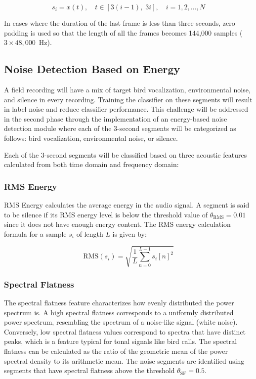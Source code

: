 \documentclass[conference]{IEEEtran}
\begin{document}
\begin{equation}
s_i = x(t), \quad t \in [3(i-1),\; 3i], \quad i = 1, 2, \ldots, N
\end{equation}

In cases where the duration of the last frame is less than three seconds, zero padding is used so that the length of all the frames becomes 144,000 samples ($3 \times 48{,}000$~Hz).

\subsection{Noise Detection Based on Energy}

A field recording will have a mix of target bird vocalization, environmental noise, and silence in every recording. Training the classifier on these segments will result in label noise and reduce classifier performance. This challenge will be addressed in the second phase through the implementation of an energy-based noise detection module where each of the 3-second segments will be categorized as follows: bird vocalization, environmental noise, or silence.

Each of the 3-second segments will be classified based on three acoustic features calculated from both time domain and frequency domain:

\subsubsection{RMS Energy}
RMS Energy calculates the average energy in the audio signal. A segment is said to be silence if its RMS energy level is below the threshold value of $\theta_{\mathrm{RMS}} = 0.01$ since it does not have enough energy content. The RMS energy calculation formula for a sample $s_i$ of length $L$ is given by:

\begin{equation}
\mathrm{RMS}(s_i) = \sqrt{\frac{1}{L} \sum_{n=0}^{L-1} s_i[n]^2}
\end{equation}

\subsubsection{Spectral Flatness}
The spectral flatness feature characterizes how evenly distributed the power spectrum is. A high spectral flatness corresponds to a uniformly distributed power spectrum, resembling the spectrum of a noise-like signal (white noise). Conversely, low spectral flatness values correspond to spectra that have distinct peaks, which is a feature typical for tonal signals like bird calls. The spectral flatness can be calculated as the ratio of the geometric mean of the power spectral density to its arithmetic mean. The noise segments are identified using segments that have spectral flatness above the threshold $\theta_{\mathrm{SF}} = 0.5$.
\end{document}
